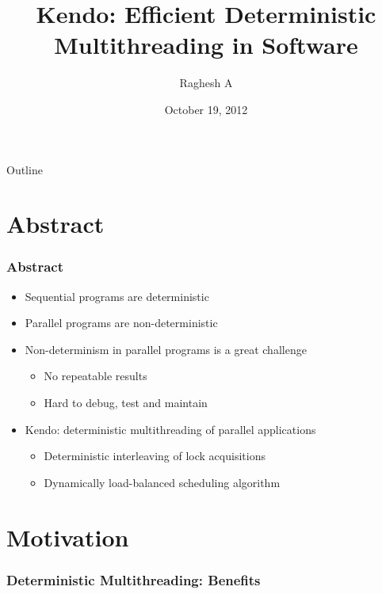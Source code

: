 \documentclass{beamer}
\title[Kendo]{Kendo: Efficient Deterministic Multithreading in Software}
\author{Raghesh A}
\institute[CSE IIT Madras]
{
  IIT Madras\\
  \medskip
  {\emph{raghesh@cse.iitm.ac.in}}
}
\date{October 19, 2012}
\begin{document}
\begin{frame}
\titlepage
\end{frame}

\begin{frame}{Outline}
\tableofcontents
\end{frame}

\section{Abstract}
\begin{frame}
\frametitle{Abstract}
\begin{itemize}
\item Sequential programs are deterministic
\item Parallel programs are non-deterministic
\item Non-determinism in parallel programs is a great challenge
\begin{itemize}
  \item No repeatable results
  \item Hard to debug, test and maintain
\end{itemize}
\item Kendo: deterministic multithreading of parallel applications
\begin{itemize}
  \item Deterministic interleaving of lock acquisitions
  \item Dynamically load-balanced scheduling algorithm
\end{itemize}
\end{itemize}
\end{frame}

\section{Motivation}
\begin{frame}
\frametitle{Deterministic Multithreading: Benefits}
\end{frame}
\end{document}
